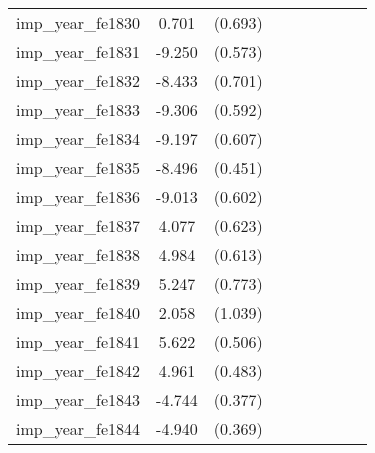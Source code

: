 {\begin{tabular}{l*{4}{cc}}
imp\_year\_fe1830&    0.701         &  (0.693)&                  &         &                  &         &                  &         \\
imp\_year\_fe1831&   -9.250\sym{***}&  (0.573)&                  &         &                  &         &                  &         \\
imp\_year\_fe1832&   -8.433\sym{***}&  (0.701)&                  &         &                  &         &                  &         \\
imp\_year\_fe1833&   -9.306\sym{***}&  (0.592)&                  &         &                  &         &                  &         \\
imp\_year\_fe1834&   -9.197\sym{***}&  (0.607)&                  &         &                  &         &                  &         \\
imp\_year\_fe1835&   -8.496\sym{***}&  (0.451)&                  &         &                  &         &                  &         \\
imp\_year\_fe1836&   -9.013\sym{***}&  (0.602)&                  &         &                  &         &                  &         \\
imp\_year\_fe1837&    4.077\sym{***}&  (0.623)&                  &         &                  &         &                  &         \\
imp\_year\_fe1838&    4.984\sym{***}&  (0.613)&                  &         &                  &         &                  &         \\
imp\_year\_fe1839&    5.247\sym{***}&  (0.773)&                  &         &                  &         &                  &         \\
imp\_year\_fe1840&    2.058\sym{*}  &  (1.039)&                  &         &                  &         &                  &         \\
imp\_year\_fe1841&    5.622\sym{***}&  (0.506)&                  &         &                  &         &                  &         \\
imp\_year\_fe1842&    4.961\sym{***}&  (0.483)&                  &         &                  &         &                  &         \\
imp\_year\_fe1843&   -4.744\sym{***}&  (0.377)&                  &         &                  &         &                  &         \\
imp\_year\_fe1844&   -4.940\sym{***}&  (0.369)&                  &         &                  &         &                  &         \\

\end{tabular}}
